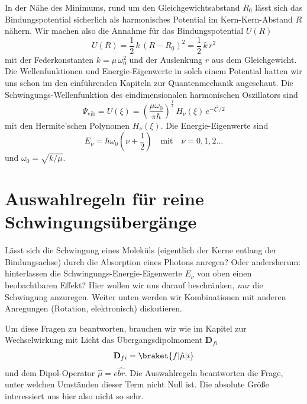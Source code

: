 In der Nähe des Minimums, rund um den Gleichgewichtsabstand $R_0$ lässt sich das Bindungspotential sicherlich als harmonisches Potential im Kern-Kern-Abstand $R$ nähern. Wir machen also die Annahme für das Bindungspotential $U(R)$
\begin{equation}
U(R)  = \frac{1}{2} \, k \, (R - R_0 )^2 = \frac{1}{2} \, k \, r^2 
\end{equation}
mit der Federkonstanten $k = \mu \, \omega_0^2$ und der Auslenkung $r$ aus dem Gleichgewicht. Die Wellenfunktionen und Energie-Eigenwerte in solch einem Potential hatten wir uns schon im den einführenden Kapiteln zur Quantenmechanik angeschaut.
Die Schwingungs-Wellenfunktion des eindimensionalen harmonischen Oszillators sind
\begin{equation}
\Psi_\text{vib} =  U(\xi) = \left(\frac{\mu \omega_0}{\pi \hbar} \right)^{\frac{1}{4}} \,
 H_\nu(\xi) \, e^{- \xi^2 /2}
\end{equation}
mit den Hermite'schen Polynomen $H_\nu(\xi)$.
Die Energie-Eigenwerte sind
\begin{equation}
E_\nu = \hbar \omega_0 \left(\nu + \frac{1}{2} \right) \quad \text{mit} \quad \nu = 0, 1, 2 \dots
\end{equation}
und $\omega_0 = \sqrt{k / \mu}$.



\section{Auswahlregeln für reine Schwingungsübergänge}

Lässt sich die Schwingung eines Moleküls (eigentlich der Kerne entlang der Bindungsachse) durch die Absorption eines Photons anregen? Oder andersherum: hinterlassen die Schwingungs-Energie-Eigenwerte $E_\nu$ von oben einen beobachtbaren Effekt? Hier wollen wir uns darauf beschränken, \emph{nur} die Schwingung anzuregen. Weiter unten werden wir Kombinationen mit anderen Anregungen (Rotation, elektronisch) diskutieren.

Um diese Fragen zu beantworten, brauchen wir wie im Kapitel zur Wechselwirkung mit Licht das  Übergangsdipolmoment $\mathbf{D}_{fi}$ 
\begin{equation}
 \mathbf{D}_{fi} = \braket{f | \hat{\mu} | i} 
\end{equation}
und dem Dipol-Operator $\hat{\mu}= e \hat{br}$. Die Auswahlregeln beantworten die Frage, unter welchen Umständen dieser Term nicht Null ist. Die absolute Größe interessiert uns hier also nicht so sehr.


